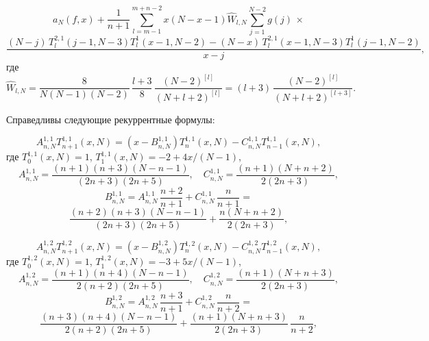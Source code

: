 \documentclass[12pt]{book}
\begin{document}
\begin{equation*}
  a_N(f,x) + \frac{1}{n+1}
   \sum_{l=m-1}^{m+n-2} x(N-x-1) \hat{W}_{l,N} \sum_{j=1}^{N-2} g(j)
  \,\times
\end{equation*}
\begin{equation*}
  \frac{(N-j)\,T^{2,1}_{l}(j-1,N-3) T_{l}^1(x-1,N-2) - (N-x)\,T^{2,1}_{l}(x-1,N-3) T_{l}^1(j-1,N-2)}{x-j},
\end{equation*}
где
\begin{equation*}
 \hat{W}_{l,N} = \frac{8}{N(N-1)(N-2)} \, \frac{l+3}{8} \,\frac{(N-2)^{[l]}}{(N+l+2)^{[l]}} =
 (l+3)\,\frac{(N-2)^{[l]}}{(N+l+2)^{[l+3]}}.
\end{equation*}








\newpage
\newpage


Справедливы следующие рекуррентные формулы:

\begin{equation*}
  A^{1,1}_{n,N} T^{1,1}_{n+1}(x,N) = (x-B^{1,1}_{n,N}) T^{1,1}_{n}(x,N) - C^{1,1}_{n,N} T^{1,1}_{n-1}(x,N),
\end{equation*}
где $T^{1,1}_{0}(x,N)=1$, $T^{1,1}_{1}(x,N)=-2+4x/(N-1)$,
\begin{equation*}
  A^{1,1}_{n,N} = \frac{(n+1)(n+3)(N-n-1)}{(2n+3)(2n+5)},
\quad
  C^{1,1}_{n,N} = \frac{(n+1)(N+n+2)}{2(2n+3)},
\end{equation*}
\begin{equation*}
  B^{1,1}_{n,N} = A^{1,1}_{n,N}\,\frac{n+2}{n+1}+C^{1,1}_{n,N}\,\frac{n}{n+1} =
\end{equation*}
\begin{equation*}
  \frac{(n+2)(n+3)(N-n-1)}{(2n+3)(2n+5)}+ \frac{n(N+n+2)}{2(2n+3)},
\end{equation*}

\begin{equation*}
  A^{1,2}_{n,N} T^{1,2}_{n+1}(x,N) = (x-B^{1,2}_{n,N}) T^{1,2}_{n}(x,N) - C^{1,2}_{n,N} T^{1,2}_{n-1}(x,N),
\end{equation*}
где $T^{1,2}_{0}(x,N)=1$, $T^{1,2}_{1}(x,N)=-3+5x/(N-1)$,
\begin{equation*}
  A^{1,2}_{n,N} = \frac{(n+1)(n+4)(N-n-1)}{2(n+2)(2n+5)},
\quad
  C^{1,2}_{n,N} = \frac{(n+1)(N+n+3)}{2(2n+3)},
\end{equation*}
\begin{equation*}
  B^{1,2}_{n,N} = A^{1,2}_{n,N}\,\frac{n+3}{n+1}+C^{1,2}_{n,N}\,\frac{n}{n+2}=
\end{equation*}
\begin{equation*}
  \frac{(n+3)(n+4)(N-n-1)}{2(n+2)(2n+5)}+\frac{(n+1)(N+n+3)}{2(2n+3)}\,\frac{n}{n+2},
\end{equation*}
\end{document}
